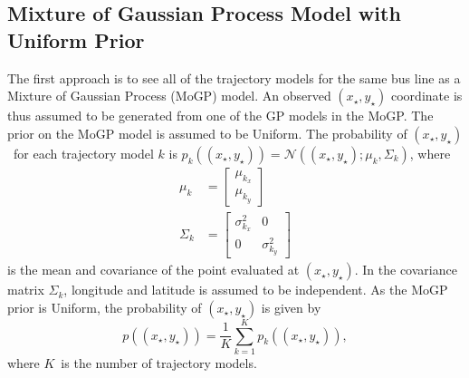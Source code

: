 \subsection{Mixture of Gaussian Process Model with Uniform Prior}
The first approach is to see all of the trajectory models for the same bus line as a Mixture of Gaussian Process (MoGP) model.
An observed $(x_\star, y_\star)$ coordinate is thus assumed to be generated from one of the GP models in the MoGP.
The prior on the MoGP model is assumed to be Uniform.
The probability of $(x_\star, y_\star)$ for each trajectory model $k$ is 
\(
    p_k((x_\star,y_\star)) = \mathcal{N}((x_\star,y_\star); \mu_k, \Sigma_k)
\), where
\begin{align}
\mu_k &= \begin{bmatrix} \mu_{k_x} \\ \mu_{k_y} \end{bmatrix} \\
\Sigma_k &= \begin{bmatrix} \sigma^2_{k_x} & 0 \\ 0 & \sigma^2_{k_y} \end{bmatrix}
\end{align}
is the mean and covariance of the point evaluated at $(x_\star,y_\star)$.
In the covariance matrix $\Sigma_k$, longitude and latitude is assumed to be independent.
As the MoGP prior is Uniform, the probability of $(x_\star, y_\star)$ is given by
\begin{equation}
    p((x_\star, y_\star)) = \frac{1}{K}\sum_{k=1}^K p_k((x_\star,y_\star)),
\end{equation}
where $K$ is the number of trajectory models.

